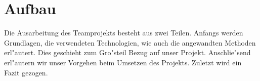 \section{Aufbau}
\label {sec:aufbau}
Die Ausarbeitung des Teamprojekts besteht aus zwei Teilen.\newline
Anfangs werden Grundlagen, die verwendeten Technologien, wie auch die angewandten Methoden erl"autert. Dies geschieht zum Gro"steil Bezug auf unser Projekt.\newline
Anschlie"send erl"autern wir unser Vorgehen beim Umsetzen des Projekts.\newline
Zuletzt wird ein Fazit gezogen.
